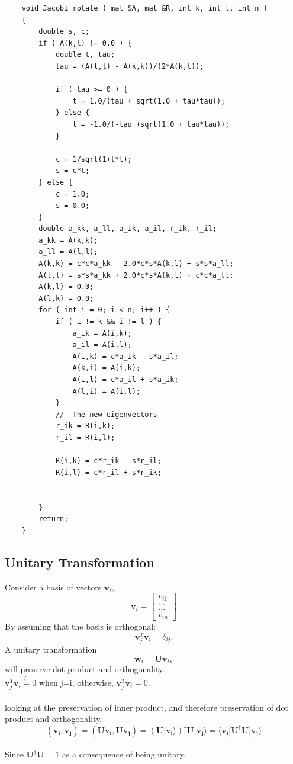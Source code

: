 \documentclass[%
reprint,
superscriptaddress,
showpacs,
nofootinbib,
bibnotes,amsmath,amssymb,aps,
prc, 
]{revtex4-1}
\begin{document}
\begin{lstlisting}
	void Jacobi_rotate ( mat &A, mat &R, int k, int l, int n )
	{
		double s, c;
		if ( A(k,l) != 0.0 ) {
			double t, tau;
			tau = (A(l,l) - A(k,k))/(2*A(k,l));
			
			if ( tau >= 0 ) {
				t = 1.0/(tau + sqrt(1.0 + tau*tau));
			} else {
				t = -1.0/(-tau +sqrt(1.0 + tau*tau));
			}
			
			c = 1/sqrt(1+t*t);
			s = c*t;
		} else {
			c = 1.0;
			s = 0.0;
		}
		double a_kk, a_ll, a_ik, a_il, r_ik, r_il;
		a_kk = A(k,k);
		a_ll = A(l,l);
		A(k,k) = c*c*a_kk - 2.0*c*s*A(k,l) + s*s*a_ll;
		A(l,l) = s*s*a_kk + 2.0*c*s*A(k,l) + c*c*a_ll;
		A(k,l) = 0.0;
		A(l,k) = 0.0;
		for ( int i = 0; i < n; i++ ) {
			if ( i != k && i != l ) {
				a_ik = A(i,k);
				a_il = A(i,l);
				A(i,k) = c*a_ik - s*a_il;
				A(k,i) = A(i,k);
				A(i,l) = c*a_il + s*a_ik;
				A(l,i) = A(i,l);
			}
			//  The new eigenvectors
			r_ik = R(i,k);
			r_il = R(i,l);
			
			R(i,k) = c*r_ik - s*r_il;
			R(i,l) = c*r_il + s*r_ik;
			
			
		}
		return;
	}
\end{lstlisting}
\subsection{Unitary Transformation}
Consider a basis of vectors $\mathbf{v}_i$,
\[
\mathbf{v}_i = \begin{bmatrix} v_{i1} \\ \dots \\ \dots \\v_{in} \end{bmatrix}
\]
By assuming that the basis is orthogonal:
\[
\mathbf{v}_j^T\mathbf{v}_i = \delta_{ij}.
\]
A unitary transformation
\[
\mathbf{w}_i=\mathbf{U}\mathbf{v}_i,
\]
will preserve dot product and orthogonality. \\

$\mathbf{v}_j^T\mathbf{v}_i \not{=} 0 $ when j=i, 
otherwise, $\mathbf{v}_j^T\mathbf{v}_i = 0$.
\\ \\
looking at the preservation of inner product, and therefore preservation of dot product and orthogonality, \\
\begin{equation*}
(\boldsymbol{v_{i}},\boldsymbol{v_{j}})=(\boldsymbol{Uv_{i}},\boldsymbol{Uv_{j}}) = (\boldsymbol{U|v_{i}}\rangle)  \boldsymbol{ ^\dagger U|v_{j}}\rangle =\langle \boldsymbol{v_{i}}|\boldsymbol{U^\dagger U}|\boldsymbol{v_{j}}\rangle
\end{equation*} 
\\
Since $\boldsymbol{U^\dagger U}= 1 $ as a consequence of being unitary,
\end{document}
